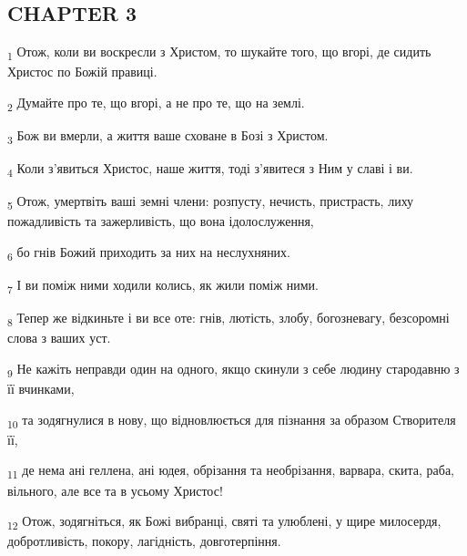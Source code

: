 \subsection{CHAPTER 3}
\begin{tcolorbox}
\textsubscript{1} Отож, коли ви воскресли з Христом, то шукайте того, що вгорі, де сидить Христос по Божій правиці.
\end{tcolorbox}
\begin{tcolorbox}
\textsubscript{2} Думайте про те, що вгорі, а не про те, що на землі.
\end{tcolorbox}
\begin{tcolorbox}
\textsubscript{3} Бож ви вмерли, а життя ваше сховане в Бозі з Христом.
\end{tcolorbox}
\begin{tcolorbox}
\textsubscript{4} Коли з'явиться Христос, наше життя, тоді з'явитеся з Ним у славі і ви.
\end{tcolorbox}
\begin{tcolorbox}
\textsubscript{5} Отож, умертвіть ваші земні члени: розпусту, нечисть, пристрасть, лиху пожадливість та зажерливість, що вона ідолослуження,
\end{tcolorbox}
\begin{tcolorbox}
\textsubscript{6} бо гнів Божий приходить за них на неслухняних.
\end{tcolorbox}
\begin{tcolorbox}
\textsubscript{7} І ви поміж ними ходили колись, як жили поміж ними.
\end{tcolorbox}
\begin{tcolorbox}
\textsubscript{8} Тепер же відкиньте і ви все оте: гнів, лютість, злобу, богозневагу, безсоромні слова з ваших уст.
\end{tcolorbox}
\begin{tcolorbox}
\textsubscript{9} Не кажіть неправди один на одного, якщо скинули з себе людину стародавню з її вчинками,
\end{tcolorbox}
\begin{tcolorbox}
\textsubscript{10} та зодягнулися в нову, що відновлюється для пізнання за образом Створителя її,
\end{tcolorbox}
\begin{tcolorbox}
\textsubscript{11} де нема ані геллена, ані юдея, обрізання та необрізання, варвара, скита, раба, вільного, але все та в усьому Христос!
\end{tcolorbox}
\begin{tcolorbox}
\textsubscript{12} Отож, зодягніться, як Божі вибранці, святі та улюблені, у щире милосердя, добротливість, покору, лагідність, довготерпіння.
\end{tcolorbox}
